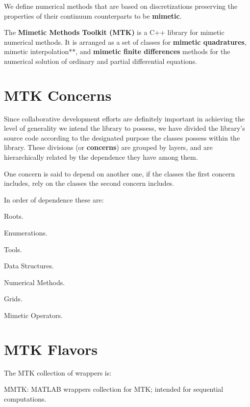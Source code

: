 We define numerical methods that are based on discretizations preserving the properties of their continuum counterparts to be {\bfseries mimetic}.

The {\bfseries Mimetic Methods Toolkit (M\+T\+K)} is a C++ library for mimetic numerical methods. It is arranged as a set of classes for {\bfseries mimetic quadratures}, mimetic interpolation$\ast$$\ast$, and {\bfseries mimetic finite differences} methods for the numerical solution of ordinary and partial differential equations.\hypertarget{index_section_mtk_concerns}{}\section{M\+T\+K Concerns}\label{index_section_mtk_concerns}
Since collaborative development efforts are definitely important in achieving the level of generality we intend the library to possess, we have divided the library's source code according to the designated purpose the classes possess within the library. These divisions (or {\bfseries concerns}) are grouped by layers, and are hierarchically related by the dependence they have among them.

One concern is said to depend on another one, if the classes the first concern includes, rely on the classes the second concern includes.

In order of dependence these are\+:


\begin{DoxyEnumerate}
\item Roots.
\item Enumerations.
\item Tools.
\item Data Structures.
\item Numerical Methods.
\item Grids.
\item Mimetic Operators.
\end{DoxyEnumerate}\hypertarget{index_section_flavors}{}\section{M\+T\+K Flavors}\label{index_section_flavors}
The M\+T\+K collection of wrappers is\+:


\begin{DoxyEnumerate}
\item M\+M\+T\+K\+: M\+A\+T\+L\+A\+B wrappers collection for M\+T\+K; intended for sequential computations.
\end{DoxyEnumerate}

